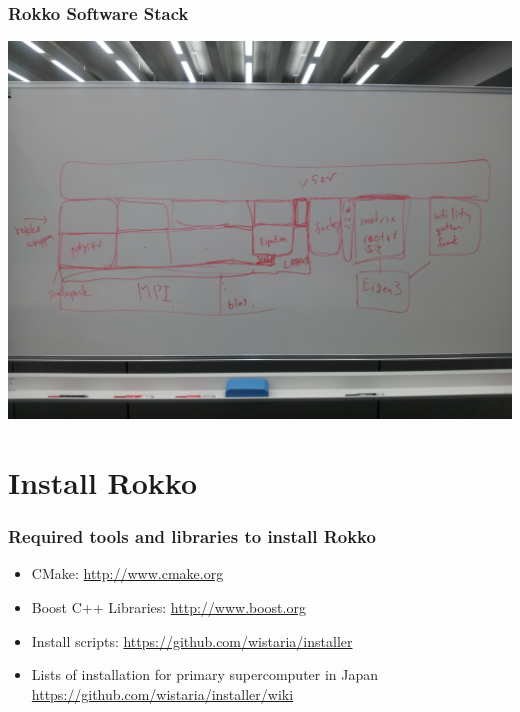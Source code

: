 \begin{frame}
  \frametitle{Rokko Software Stack}
  \begin{center}
    \includegraphics[height=0.8\textheight]{figure/rokko-software-stack.jpg}
  \end{center}
\end{frame}

\section{Install Rokko}

\begin{frame}
  \frametitle{Required tools and libraries to install Rokko}
  \begin{itemize}
    \setlength{\itemsep}{1em}
  \item CMake: \url{http://www.cmake.org}
  \item Boost C++ Libraries: \url{http://www.boost.org}
  \item Install scripts: \url{https://github.com/wistaria/installer}
  \item Lists of installation for primary supercomputer in Japan \\
    \url{https://github.com/wistaria/installer/wiki}
  \end{itemize}
\end{frame}

